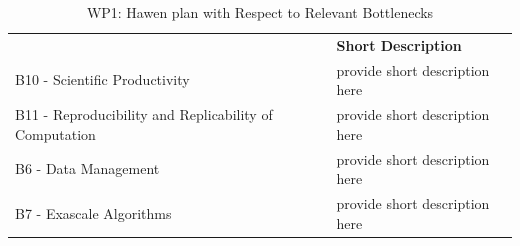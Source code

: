 \begin{table}[h!]
    \centering
    
    

    \centering
    { 
        \setlength{\parindent}{0pt}
        \def\arraystretch{1.25}
        {
            \fontsize{9}{11}\selectfont
            \begin{tabular}{!{\color{numpexgray}\vrule}p{.25\linewidth}!{\color{numpexgray}\vrule}p{.6885\linewidth}!{\color{numpexgray}\vrule}}
    
     &  {\rule{0pt}{2.5ex}\color{white}\bf Short Description }\\ 
    
    B10 - Scientific Productivity & provide short description here \\
    B11 - Reproducibility and Replicability of Computation & provide short description here \\
    B6 - Data Management & provide short description here \\
    B7 - Exascale Algorithms & provide short description here \\
\end{tabular}
        }
    }
    \caption{WP1: Hawen plan with Respect to Relevant Bottlenecks}
    \label{tab:WP1:Hawen:bottlenecks}
\end{table}
